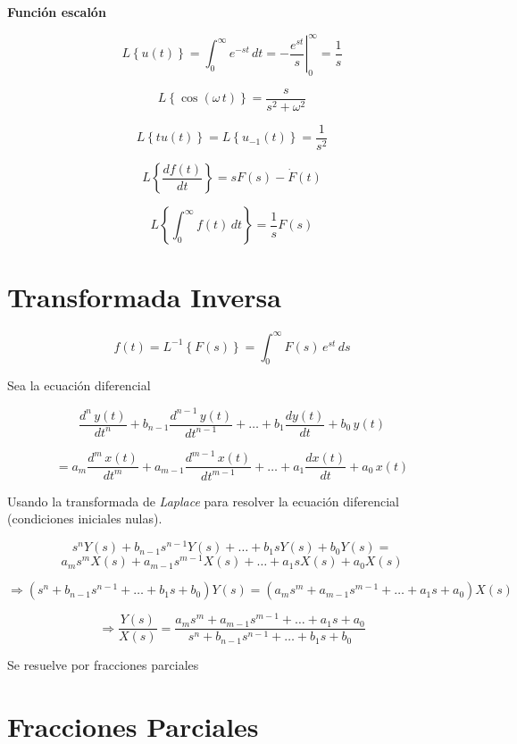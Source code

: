 \textbf{Función escalón}

$$\left. L\left\lbrace u(t) \right\rbrace = \displaystyle \int_{0}^{\infty} e^{-st}\, dt = - \dfrac{e^{st}}{s} \right|_{0}^{\infty} = \dfrac{1}{s}$$

$$ L\left\lbrace \cos (\omega\, t) \right\rbrace = \dfrac{s}{s^2 + \omega^2}$$

$$ L\left\lbrace tu(t) \right\rbrace = L\left\lbrace u_{-1}(t) \right\rbrace = \dfrac{1}{s^2}$$

$$ L\left\lbrace \dfrac{df(t)}{dt} \right\rbrace = sF(s) - \dot{F}(t)$$

$$ L\left\lbrace \displaystyle \int_{0}^{\infty} f(t)\, dt \right\rbrace = \dfrac{1}{s} F(s)$$




\section{Transformada Inversa}

$$f(t) = L^{-1} \left\lbrace F(s) \right\rbrace = \displaystyle \int_{0}^{\infty} F(s)\, e^{st}\, ds$$

Sea la ecuación diferencial

$$\dfrac{d^n\, y(t)}{dt^{n}} + b_{n -1} \dfrac{d^{n - 1}\, y(t)}{dt^{n - 1}} + \ldots + b_{1} \dfrac{dy(t)}{dt} + b_{0}\,y(t)$$

$$= a_{m}\dfrac{d^m\, x(t)}{dt^{m}} + a_{m -1} \dfrac{d^{m - 1}\, x(t)}{dt^{m - 1}} + \ldots + a_{1} \dfrac{dx(t)}{dt} + a_{0}\,x(t)$$

Usando la transformada de \textit{Laplace} para resolver la ecuación diferencial 
(condiciones iniciales nulas).

$$s^{n}Y(s) + b_{n - 1}s^{n - 1}Y(s) + \ldots + b_{1}sY(s) + b_{0}Y(s) = $$
$$a_{m}s^{m}X(s) + a_{m - 1}s^{m - 1}X(s) + \ldots + a_{1}sX(s) + a_{0}X(s)$$

$$\Rightarrow (s^n + b_{n - 1} s^{n -1} + \ldots + b_{1}s + b_{0}) Y(s) = (a_{m}s^m + a_{m - 1}s^{m - 1} + \ldots + a_{1}s + a_{0})X(s)$$

$$\Rightarrow \dfrac{Y(s)}{X(s)} = \dfrac{a_{m}s^m + a_{m - 1}s^{m - 1} + \ldots + a_{1}s + a_{0}}{s^n + b_{n - 1} s^{n -1} + \ldots + b_{1}s + b_{0}}$$

Se resuelve por fracciones parciales

\section{Fracciones Parciales}

